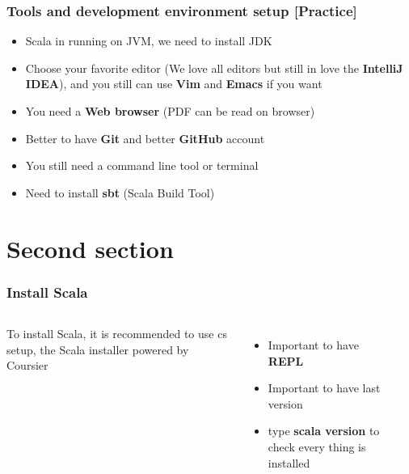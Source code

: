 \documentclass{beamer}
\begin{document}
\begin{frame}
\frametitle{Tools and development environment setup [Practice]}

\begin{itemize}
    \item Scala in running on JVM, we need to install JDK 
    \item Choose your favorite editor (We love all editors but still in love the \textbf{IntelliJ IDEA}), and you still can use \textbf{Vim} and \textbf{Emacs} if you want
    \item You need a \textbf{Web browser} (PDF can be read on browser) 
    \item Better to have \textbf{Git} and better \textbf{GitHub} account
    \item You still need a command line tool or terminal
    \item Need to install \textbf{sbt} (Scala Build Tool)
\end{itemize}
\end{frame}

\section{Second section}

\begin{frame}
\frametitle{Install Scala}

\begin{columns}

To install Scala, it is recommended to use cs setup, the Scala installer powered by Coursier

\begin{itemize}
  \item Important to have \textbf{REPL}
  \item Important to have last version
  \item type \textbf{scala version} to check every thing is installed
\end{itemize}

 \\
\end{columns}
\end{frame}
\end{document}
